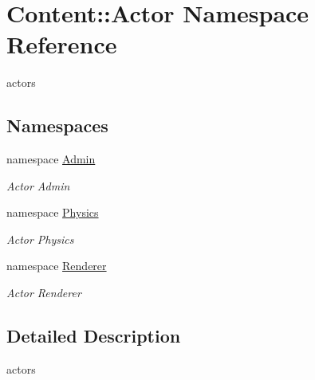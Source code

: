 \hypertarget{namespaceContent_1_1Actor}{
\section{Content::Actor Namespace Reference}
\label{namespaceContent_1_1Actor}
}


actors  
\subsection*{Namespaces}
\begin{DoxyCompactItemize}
\item 
namespace \hyperlink{namespaceContent_1_1Actor_1_1Admin}{Admin}


\begin{DoxyCompactList}\small\item\em Actor Admin \item\end{DoxyCompactList}\item 
namespace \hyperlink{namespaceContent_1_1Actor_1_1Physics}{Physics}


\begin{DoxyCompactList}\small\item\em Actor Physics \item\end{DoxyCompactList}\item 
namespace \hyperlink{namespaceContent_1_1Actor_1_1Renderer}{Renderer}


\begin{DoxyCompactList}\small\item\em Actor Renderer \item\end{DoxyCompactList}\end{DoxyCompactItemize}


\subsection{Detailed Description}
actors 